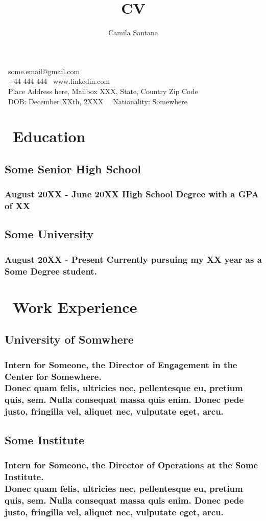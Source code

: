 \documentclass[12pt]{article}
\makeatletter
\renewcommand{\maketitle}{
\begin{flushleft}
{\Huge\bfseries
\theauthor}

\vspace{0.27em}

\faPaperPlane\ some.email@gmail.com\\
\faMobilePhone \ +44 444 444 \faLinkedin \ www.linkedin.com\\
\faMapMarker \ Place Address here, Mailbox XXX, State, Country Zip Code\\
\faCalendar \ DOB: December XXth, 2XXX \ \faFemale \ Nationality: Somewhere\\

\end{flushleft}
}
\makeatother
\begin{document}
\title{CV}
\author{Camila Santana}
\maketitle
\section{\faGraduationCap \ Education}
	\subsection{\textbf{Some Senior High School}}
		\subsubsection{August 20XX - June 20XX High School Degree with a GPA of XX}
	\subsection{\textbf{Some University}}
		\subsubsection{August 20XX - Present Currently pursuing my XX year as a Some Degree student.}
\section{\faBriefcase \ Work Experience}
	\subsection{\textbf{University of Somwhere}}
		\subsubsection{Intern for Someone, the Director of Engagement in the Center for Somewhere. \\
		Donec quam felis, ultricies nec, pellentesque eu, pretium quis, sem. Nulla consequat massa quis enim. Donec pede justo, fringilla vel, aliquet nec, vulputate eget, arcu.}
	\subsection{\textbf{Some Institute}}
		\subsubsection{Intern for Someone, the Director of Operations at the Some Institute. \\
		Donec quam felis, ultricies nec, pellentesque eu, pretium quis, sem. Nulla consequat massa quis enim. Donec pede justo, fringilla vel, aliquet nec, vulputate eget, arcu.}
\end{document}
